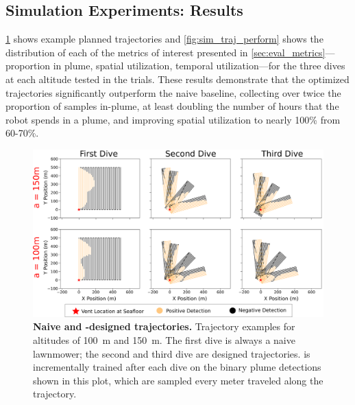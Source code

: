 \subsection{Simulation Experiments: Results}
\cref{fig:sim_traj_example} shows example planned trajectories and \cref{fig:sim_traj_perform} shows the distribution of each of the metrics of interest presented in \cref{sec:eval_metrics}---proportion in plume, spatial utilization, temporal utilization---for the three dives at each altitude tested in the trials. These results demonstrate that the \PHORTEX optimized trajectories significantly outperform the naive baseline, collecting over twice the proportion of samples in-plume, at least doubling the number of hours that the robot spends in a plume, and improving spatial utilization to nearly 100\% from 60-70\%. 

\begin{figure}[h!]
    \centering
    \includegraphics[width=0.85\columnwidth]{figures/sim_traj.png}
    \caption{\textbf{Naive and \PHORTEX-designed trajectories.} Trajectory examples for altitudes of \SI{100}{\meter} and \SI{150}{\meter}. The first dive is always a naive lawnmower; the second and third dive are \PHORTEX designed trajectories. \PHUMES is incrementally trained after each dive on the binary plume detections shown in this plot, which are sampled every meter traveled along the trajectory.}
    \label{fig:sim_traj_example}
\end{figure}

